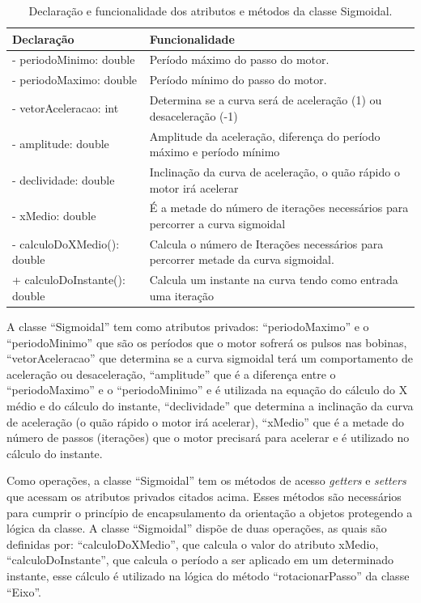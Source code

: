 \begin{table}[H]
    \footnotesize
    \centering
    \caption{Declaração e funcionalidade dos atributos e métodos da classe Sigmoidal.}
    \begin{tabular}{lp{9cm}}
        \hline
        \textbf{Declaração} & \textbf{Funcionalidade}\\
        \hline
        - periodoMinimo: double & Período máximo do passo do motor.\\
        - periodoMaximo: double & Período mínimo do passo do motor.\\
        - vetorAceleracao: int & Determina se a curva será de aceleração (1) ou desaceleração (-1)\\
        - amplitude: double & Amplitude da aceleração, diferença do período máximo e período mínimo\\
        - declividade: double & Inclinação da curva de aceleração, o quão rápido o motor irá acelerar\\
        - xMedio: double & É a metade do número de iterações necessários para percorrer a curva sigmoidal\\
        - calculoDoXMedio(): double & Calcula o número de Iterações necessários para percorrer metade da curva sigmoidal.\\
        + calculoDoInstante(): double & Calcula um instante na curva tendo como entrada uma iteração\\
        \hline       
    \end{tabular}
    \label{tab:classesigmoidal}
\end{table}

A classe “Sigmoidal” tem como atributos privados: “periodoMaximo” e o “periodoMinimo” que são os períodos 
que o motor sofrerá os pulsos nas bobinas, “vetorAceleracao” que determina se a curva sigmoidal terá 
um comportamento de aceleração ou desaceleração, “amplitude” que é a diferença entre o “periodoMaximo” 
e o “periodoMinimo” e é utilizada na equação do cálculo do X médio e do cálculo do instante, “declividade” 
que determina a inclinação da curva de aceleração (o quão rápido o motor irá acelerar), “xMedio” que é a 
metade do número de passos (iterações) que o motor precisará para acelerar e é utilizado no cálculo 
do instante. 

Como operações, a classe “Sigmoidal” tem os métodos de acesso \textit{getters} e \textit{setters} 
que acessam os atributos privados citados acima. Esses métodos são necessários para cumprir 
o princípio de encapsulamento da orientação a objetos protegendo a lógica da classe. 
A classe “Sigmoidal” dispõe de duas operações, as quais são definidas por: “calculoDoXMedio”, 
que calcula o valor do atributo xMedio, “calculoDoInstante”, que calcula o período a 
ser aplicado em um determinado instante, esse cálculo é utilizado na lógica do método “rotacionarPasso” 
da classe “Eixo”.

